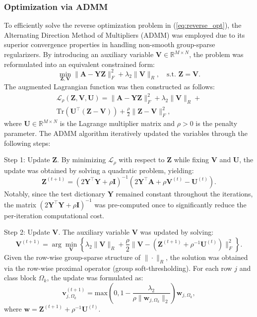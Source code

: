 \documentclass[10pt,comsoc]{IEEEtran}
\begin{document}
\subsubsection{Optimization via ADMM}

To efficiently solve the reverse optimization problem in (\ref{eq:reverse_opt}), the Alternating Direction Method of Multipliers (ADMM) was employed due to its superior convergence properties in handling non-smooth group-sparse regularizers. By introducing an auxiliary variable $\mathbf{V} \in \mathbb{R}^{M \times N}$, the problem was reformulated into an equivalent constrained form:
\begin{equation}
\min_{\mathbf{Z}, \mathbf{V}} \|\mathbf{A} - \mathbf{YZ}\|_F^2 + \lambda_2 \|\mathbf{V}\|_R, \quad \text{s.t. } \mathbf{Z} = \mathbf{V}.
\end{equation}
The augmented Lagrangian function was then constructed as follows:
\begin{equation}
\begin{split}
\mathcal{L}_\rho (\mathbf{Z}, \mathbf{V}, \mathbf{U}) = \|\mathbf{A} - \mathbf{YZ}\|_F^2 + \lambda_2 \|\mathbf{V}\|_R + \\
\text{Tr}(\mathbf{U}^\top (\mathbf{Z} - \mathbf{V})) + \frac{\rho}{2} \|\mathbf{Z} - \mathbf{V}\|_F^2,
\end{split}
\end{equation}
where $\mathbf{U} \in \mathbb{R}^{M \times N}$ is the Lagrange multiplier matrix and $\rho > 0$ is the penalty parameter. The ADMM algorithm iteratively updated the variables through the following steps:

Step 1: Update $\mathbf{Z}$. By minimizing $\mathcal{L}_\rho$ with respect to $\mathbf{Z}$ while fixing $\mathbf{V}$ and $\mathbf{U}$, the update was obtained by solving a quadratic problem, yielding:
\begin{equation}
\mathbf{Z}^{(t+1)} = (2\mathbf{Y}^\top\mathbf{Y} + \rho \mathbf{I})^{-1} (2\mathbf{Y}^\top\mathbf{A} + \rho \mathbf{V}^{(t)} - \mathbf{U}^{(t)}).
\end{equation}
Notably, since the test dictionary $\mathbf{Y}$ remained constant throughout the iterations, the matrix $(2\mathbf{Y}^\top\mathbf{Y} + \rho \mathbf{I})^{-1}$ was pre-computed once to significantly reduce the per-iteration computational cost.

Step 2: Update $\mathbf{V}$. The auxiliary variable $\mathbf{V}$ was updated by solving:
\begin{equation}
\mathbf{V}^{(t+1)} = \arg\min_{\mathbf{V}} \left\{ \lambda_2 \|\mathbf{V}\|_R + \frac{\rho}{2} \|\mathbf{V} - (\mathbf{Z}^{(t+1)} + \rho^{-1}\mathbf{U}^{(t)})\|_F^2 \right\}.
\end{equation}
Given the row-wise group-sparse structure of $\|\cdot\|_R$, the solution was obtained via the row-wise proximal operator (group soft-thresholding). For each row $j$ and class block $\Omega_k$, the update was formulated as:
\begin{equation}
\mathbf{v}_{j, \Omega_k}^{(t+1)} = \text{max} \left( 0, 1 - \frac{\lambda_2}{\rho \|\mathbf{w}_{j, \Omega_k}\|_2} \right) \mathbf{w}_{j, \Omega_k},
\end{equation}
where $\mathbf{w} = \mathbf{Z}^{(t+1)} + \rho^{-1}\mathbf{U}^{(t)}$.
\end{document}
